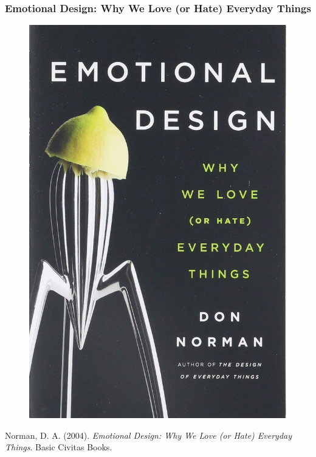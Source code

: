 \documentclass[screen, aspectratio=169]{beamer}
\begin{document}
%
\begin{frame}
\frametitle{Emotional Design: Why We Love (or Hate) Everyday Things}
 \begin{figure}
	\includegraphics[scale=0.08]{img/Donald-Norman-Emotional-Design.jpg}
    \end{figure}
    Norman, D. A. (2004). \emph{Emotional Design: Why We Love (or Hate) Everyday Things}. Basic Civitas Books. \cite{Norman.2004.Emotional}
\end{frame}
%
\end{document}
